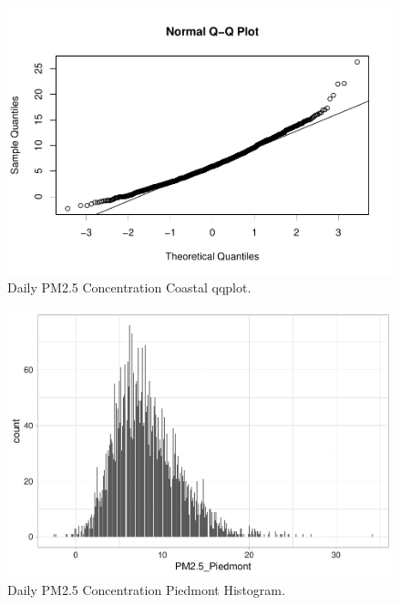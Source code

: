 \documentclass[12pt,]{article}
\begin{document}
\begin{figure}
\centering
\includegraphics{Raby_ENV872_Project_files/figure-latex/unnamed-chunk-43-1.pdf}
\caption{Daily PM2.5 Concentration Coastal qqplot. \label{Coastqqplot}}
\end{figure}

\begin{figure}
\centering
\includegraphics{Raby_ENV872_Project_files/figure-latex/unnamed-chunk-44-1.pdf}
\caption{Daily PM2.5 Concentration Piedmont Histogram.
\label{Piedmonthistplot}}
\end{figure}
\end{document}
